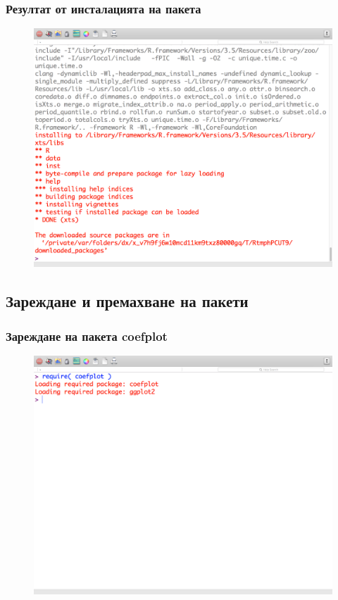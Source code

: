 \documentclass{beamer}
\begin{document}
\begin{frame}
\frametitle{Резултат от инсталацията на пакета}
\begin{figure}[]\includegraphics[width=\textwidth,height=0.75\textheight]{pic0017}\end{figure}
\end{frame}

\subsection{Зареждане и премахване на пакети}

\begin{frame}
\frametitle{Зареждане на пакета coefplot}
\begin{figure}[]\includegraphics[width=\textwidth,height=0.75\textheight]{pic0018}\end{figure}
\end{frame}
\end{document}
